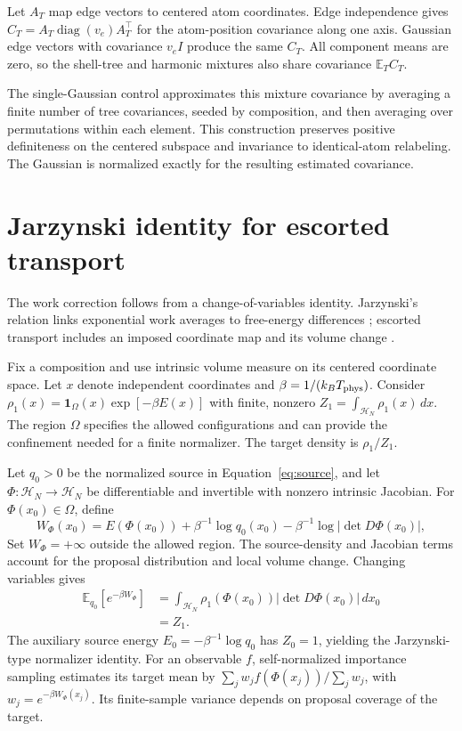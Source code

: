 \documentclass{article}
\newcommand{\HH}{\mathcal H}
\newcommand{\EE}{\mathbb E}
\begin{document}
Let $A_T$ map edge vectors to centered atom coordinates. Edge independence gives $C_T=A_T\operatorname{diag}(v_e)A_T^\top$ for the atom-position covariance along one axis. Gaussian edge vectors with covariance $v_eI$ produce the same $C_T$. All component means are zero, so the shell-tree and harmonic mixtures also share covariance $\EE_TC_T$.

The single-Gaussian control approximates this mixture covariance by averaging a finite number of tree covariances, seeded by composition, and then averaging over permutations within each element. This construction preserves positive definiteness on the centered subspace and invariance to identical-atom relabeling. The Gaussian is normalized exactly for the resulting estimated covariance.

\section{Jarzynski identity for escorted transport}\label{app:jarzynski}
The work correction follows from a change-of-variables identity. Jarzynski's relation links exponential work averages to free-energy differences \citep{jarzynski1997master,hummerszabo2001}; escorted transport includes an imposed coordinate map and its volume change \citep{escorted2008}.

Fix a composition and use intrinsic volume measure on its centered coordinate space. Let $x$ denote independent coordinates and $\beta=1/(k_B T_{\rm phys})$. Consider $\rho_1(x)=\mathbf1_\Omega(x)\exp[-\beta E(x)]$ with finite, nonzero $Z_1=\int_{\HH_N}\rho_1(x)\,dx$. The region $\Omega$ specifies the allowed configurations and can provide the confinement needed for a finite normalizer. The target density is $\rho_1/Z_1$.

Let $q_0>0$ be the normalized source in Equation~\eqref{eq:source}, and let $\Phi:\HH_N\to\HH_N$ be differentiable and invertible with nonzero intrinsic Jacobian. For $\Phi(x_0)\in\Omega$, define
\begin{equation}
 W_\Phi(x_0)=E(\Phi(x_0))+
 \beta^{-1}\log q_0(x_0)-
 \beta^{-1}\log|\det D\Phi(x_0)|,
\end{equation}
Set $W_\Phi=+\infty$ outside the allowed region. The source-density and Jacobian terms account for the proposal distribution and local volume change. Changing variables gives
\begin{align}
 \EE_{q_0}[e^{-\beta W_\Phi}]
 &=\int_{\HH_N}\rho_1(\Phi(x_0))|\det D\Phi(x_0)|\,dx_0\\
 &=Z_1.
\end{align}
The auxiliary source energy $E_0=-\beta^{-1}\log q_0$ has $Z_0=1$, yielding the Jarzynski-type normalizer identity. For an observable $f$, self-normalized importance sampling estimates its target mean by $\sum_j w_j f(\Phi(x_j))/\sum_j w_j$, with $w_j=e^{-\beta W_\Phi(x_j)}$. Its finite-sample variance depends on proposal coverage of the target.
\end{document}

